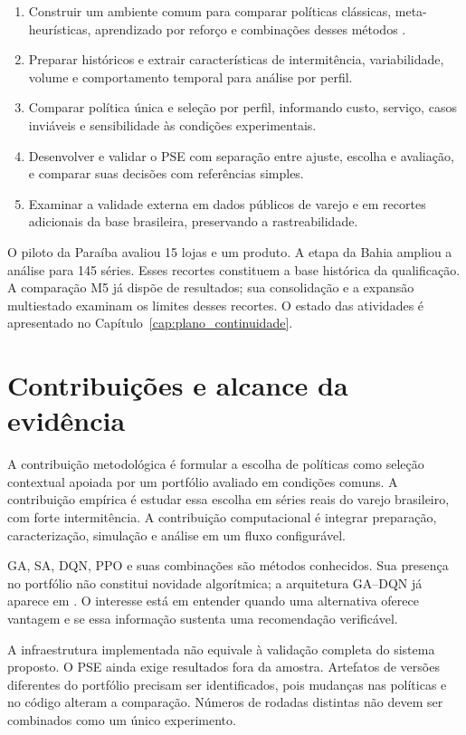 \begin{enumerate}
  \item Construir um ambiente comum para comparar políticas clássicas, meta-heurísticas, aprendizado por reforço e combinações desses métodos \citep{Law2015SimulationModeling,Talbi2009Metaheuristics}.
  \item Preparar históricos e extrair características de intermitência, variabilidade, volume e comportamento temporal para análise por perfil.
  \item Comparar política única e seleção por perfil, informando custo, serviço, casos inviáveis e sensibilidade às condições experimentais.
  \item Desenvolver e validar o PSE com separação entre ajuste, escolha e avaliação, e comparar suas decisões com referências simples.
  \item Examinar a validade externa em dados públicos de varejo e em recortes adicionais da base brasileira, preservando a rastreabilidade.
\end{enumerate}

O piloto da Paraíba avaliou 15 lojas e um produto. A etapa da Bahia ampliou a análise para 145 séries. Esses recortes constituem a base histórica da qualificação. A comparação M5 já dispõe de resultados; sua consolidação e a expansão multiestado examinam os limites desses recortes. O estado das atividades é apresentado no Capítulo~\ref{cap:plano_continuidade}.

\section{Contribuições e alcance da evidência}

A contribuição metodológica é formular a escolha de políticas como seleção contextual apoiada por um portfólio avaliado em condições comuns. A contribuição empírica é estudar essa escolha em séries reais do varejo brasileiro, com forte intermitência. A contribuição computacional é integrar preparação, caracterização, simulação e análise em um fluxo configurável.

GA, SA, DQN, PPO e suas combinações são métodos conhecidos. Sua presença no portfólio não constitui novidade algorítmica; a arquitetura GA--DQN já aparece em \citet{Zabraoui2025GaDQN}. O interesse está em entender quando uma alternativa oferece vantagem e se essa informação sustenta uma recomendação verificável.

A infraestrutura implementada não equivale à validação completa do sistema proposto. O PSE ainda exige resultados fora da amostra. Artefatos de versões diferentes do portfólio precisam ser identificados, pois mudanças nas políticas e no código alteram a comparação. Números de rodadas distintas não devem ser combinados como um único experimento.

